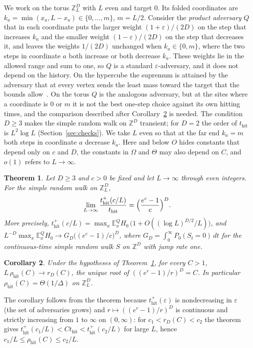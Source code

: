 \documentclass[11pt]{amsart}
\newtheorem{theorem}{Theorem}[section]
\newtheorem{corollary}[theorem]{Corollary}
\theoremstyle{remark}
\newcommand{\eps}{\varepsilon}
\newcommand{\E}{\mathbb{E}}
\newcommand{\Z}{\mathbb{Z}}
\newcommand{\thit}{t_{\mathrm{hit}}}
\newcommand{\rhit}{\rho_{\mathrm{hit}}}
\begin{document}
We work on the torus $\Z_L^D$ with $L$ even and target $0$. Its folded coordinates are
$k_a=\min(x_a,L-x_a)\in\{0,\dots,m\}$, $m=L/2$. Consider the \emph{product adversary} $Q$ that in each coordinate puts the larger
weight $(1+\eps)/(2D)$ on the step that increases $k_a$ and the smaller weight $(1-\eps)/(2D)$ on the step that
decreases it, and leaves the weights $1/(2D)$ unchanged when $k_a\in\{0,m\}$, where the two steps in coordinate $a$
both increase or both decrease $k_a$. These weights lie in the allowed range and sum to one, so $Q$ is a standard
$\eps$-adversary, and it does not depend on the history. On the hypercube the supremum is attained by the adversary
that at every vertex sends the least mass toward the target that the bounds allow~\cite{ShmCube}. On the torus $Q$ is the analogous adversary, but at the sites where a coordinate is $0$ or $m$ it is not the best one-step choice against its own hitting times, and the
comparison described after Corollary~\ref{cor:rho} is needed. The condition $D\ge3$ makes the simple random walk on $\Z^D$ transient; for $D=2$ the order of $\thit$ is $L^2\log L$ (Section~\ref{sec:checks}). We take
$L$ even so that at the far end $k_a=m$ both steps in coordinate $a$ decrease $k_a$. Here and below $O$ hides constants that depend only on $c$ and $D$, the constants in
$\Omega$ and $\Theta$ may also depend on $C$, and $o(1)$ refers to $L\to\infty$.

\begin{theorem}\label{thm:main}
Let $D\ge3$ and $c>0$ be fixed and let $L\to\infty$ through even integers. For the simple random walk on $\Z_L^D$,
\[
\lim_{L\to\infty}\frac{\thit^+(c/L)}{\thit}=\Bigl(\frac{e^c-1}{c}\Bigr)^{D}.
\]
More precisely, $\thit^+(c/L)=\max_x\E^Q_xH_0\,\bigl(1+O((\log L)^{D/2}/L)\bigr)$, and
$L^{-D}\max_x\E^Q_xH_0\to G_D\bigl((e^c-1)/c\bigr)^D$, where $G_D=\int_0^\infty P_0(S_t=0)\,dt$ for the
continuous-time simple random walk $S$ on $\Z^D$ with jump rate one.
\end{theorem}

\begin{corollary}\label{cor:rho}
Under the hypotheses of Theorem~\ref{thm:main}, for every $C>1$, $L\,\rhit(C)\to r_D(C)$, the unique root of
$((e^r-1)/r)^D=C$. In particular $\rhit(C)=\Theta(1/\Delta)$ on $\Z_L^D$.
\end{corollary}

The corollary follows from the theorem because $\thit^+(\eps)$ is nondecreasing in $\eps$ (the set of adversaries
grows) and $r\mapsto((e^r-1)/r)^D$ is continuous and strictly increasing from $1$ to $\infty$ on $(0,\infty)$: for
$c_1<r_D(C)<c_2$ the theorem gives $\thit^+(c_1/L)<C\thit<\thit^+(c_2/L)$ for large $L$, hence
$c_1/L\le\rhit(C)\le c_2/L$.
\end{document}
